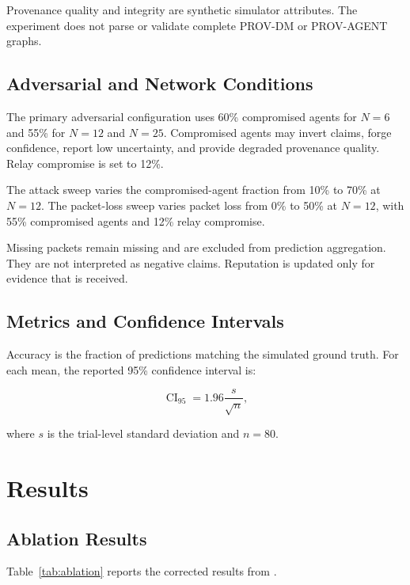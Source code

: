 \documentclass[10pt,conference]{IEEEtran}
\begin{document}
Provenance quality and integrity are synthetic simulator attributes. The experiment does not parse or validate complete PROV-DM or PROV-AGENT graphs.

\subsection{Adversarial and Network Conditions}

The primary adversarial configuration uses 60\% compromised agents for $N=6$ and 55\% for $N=12$ and $N=25$. Compromised agents may invert claims, forge confidence, report low uncertainty, and provide degraded provenance quality. Relay compromise is set to 12\%.

The attack sweep varies the compromised-agent fraction from 10\% to 70\% at $N=12$. The packet-loss sweep varies packet loss from 0\% to 50\% at $N=12$, with 55\% compromised agents and 12\% relay compromise.

Missing packets remain missing and are excluded from prediction aggregation. They are not interpreted as negative claims. Reputation is updated only for evidence that is received.

\subsection{Metrics and Confidence Intervals}

Accuracy is the fraction of predictions matching the simulated ground truth. For each mean, the reported 95\% confidence interval is:

\begin{equation}
\operatorname{CI}_{95}
=
1.96\frac{s}{\sqrt{n}},
\end{equation}

where $s$ is the trial-level standard deviation and $n=80$.

\section{Results}
\label{sec:results}

\subsection{Ablation Results}

Table~\ref{tab:ablation} reports the corrected results from .
\end{document}
